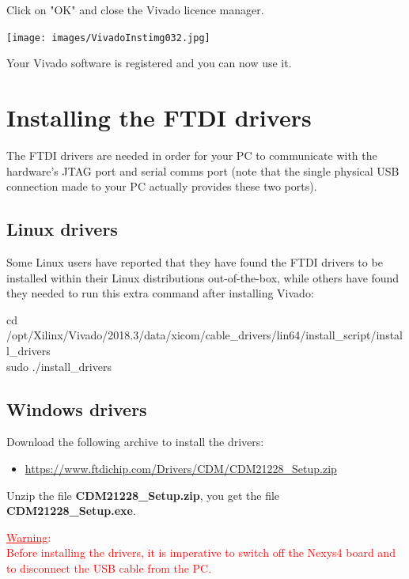 \begin{minipage}{\linewidth}
  Click on "OK" and close the Vivado licence manager.
  \\
  \begin{center}
    \texttt{[image: images/VivadoInstimg032.jpg]}
  \end{center}

  Your Vivado software is registered and you can now use it.
\end{minipage}

\section{Installing the FTDI drivers}

The FTDI drivers are needed in order for your PC to communicate with the hardware's JTAG port and serial comms port (note that the single physical USB connection made to your PC actually provides these two ports).

\subsection{Linux drivers}

Some Linux users have reported that they have found the FTDI drivers to be installed within their Linux distributions out-of-the-box, while others have found they needed to run this extra command after installing Vivado:

cd /opt/Xilinx/Vivado/2018.3/data/xicom/cable\_drivers/lin64/install\_script/install\_drivers \\
sudo ./install\_drivers

\subsection{Windows drivers}

Download the following archive to install the drivers:

\begin{itemize}
  \item \url{https://www.ftdichip.com/Drivers/CDM/CDM21228\_Setup.zip}
\end{itemize}

Unzip the file \textbf{CDM21228\_Setup.zip}, you get the file \textbf{CDM21228\_Setup.exe}.

\textcolor{red}{\underline{Warning}: \\
Before installing the drivers, it is imperative to switch off the Nexys4 board and to disconnect the USB cable from the PC.}

